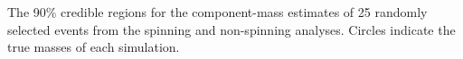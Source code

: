 The 90\% credible regions for the component-mass estimates of 25 randomly selected events from the spinning and non-spinning analyses.  Circles indicate the true masses of each simulation.